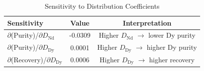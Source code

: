 \begin{table}[htbp]
\centering
\caption{Sensitivity to Distribution Coefficients}
\label{tab:d-sensitivities}
\begin{tabular}{lcc}
\toprule
Sensitivity & Value & Interpretation \\
\midrule
$\partial$(Purity)/$\partial D_{\text{Nd}}$ & -0.0309 & Higher $D_{\text{Nd}}$ $\rightarrow$ lower Dy purity \\
$\partial$(Purity)/$\partial D_{\text{Dy}}$ & 0.0001 & Higher $D_{\text{Dy}}$ $\rightarrow$ higher Dy purity \\
$\partial$(Recovery)/$\partial D_{\text{Dy}}$ & 0.0006 & Higher $D_{\text{Dy}}$ $\rightarrow$ higher recovery \\
\bottomrule
\end{tabular}
\end{table}